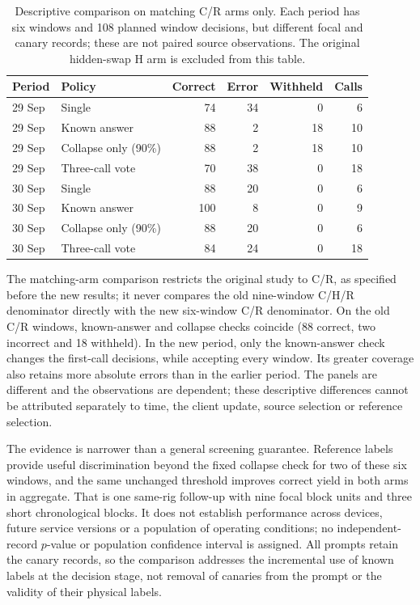 \begin{table}[htbp]\centering\small
\caption{Descriptive comparison on matching C/R arms only. Each period has six windows and 108 planned window decisions, but different focal and canary records; these are not paired source observations. The original hidden-swap H arm is excluded from this table.}
\label{tab:canary_stability_periods}
\begin{tabular}{@{}llrrrr@{}}\toprule
Period & Policy & Correct & Error & Withheld & Calls \\\midrule
29 Sep & Single & 74 & 34 & 0 & 6 \\
29 Sep & Known answer & 88 & 2 & 18 & 10 \\
29 Sep & Collapse only (90\%) & 88 & 2 & 18 & 10 \\
29 Sep & Three-call vote & 70 & 38 & 0 & 18 \\
30 Sep & Single & 88 & 20 & 0 & 6 \\
30 Sep & Known answer & 100 & 8 & 0 & 9 \\
30 Sep & Collapse only (90\%) & 88 & 20 & 0 & 6 \\
30 Sep & Three-call vote & 84 & 24 & 0 & 18 \\
\bottomrule\end{tabular}\end{table}

The matching-arm comparison restricts the original study to C/R, as specified before the new results; it never compares the old nine-window C/H/R denominator directly with the new six-window C/R denominator. On the old C/R windows, known-answer and collapse checks coincide (88 correct, two incorrect and 18 withheld). In the new period, only the known-answer check changes the first-call decisions, while accepting every window. Its greater coverage also retains more absolute errors than in the earlier period. The panels are different and the observations are dependent; these descriptive differences cannot be attributed separately to time, the client update, source selection or reference selection.

The evidence is narrower than a general screening guarantee. Reference labels provide useful discrimination beyond the fixed collapse check for two of these six windows, and the same unchanged threshold improves correct yield in both arms in aggregate. That is one same-rig follow-up with nine focal block units and three short chronological blocks. It does not establish performance across devices, future service versions or a population of operating conditions; no independent-record $p$-value or population confidence interval is assigned. All prompts retain the canary records, so the comparison addresses the incremental use of known labels at the decision stage, not removal of canaries from the prompt or the validity of their physical labels.

